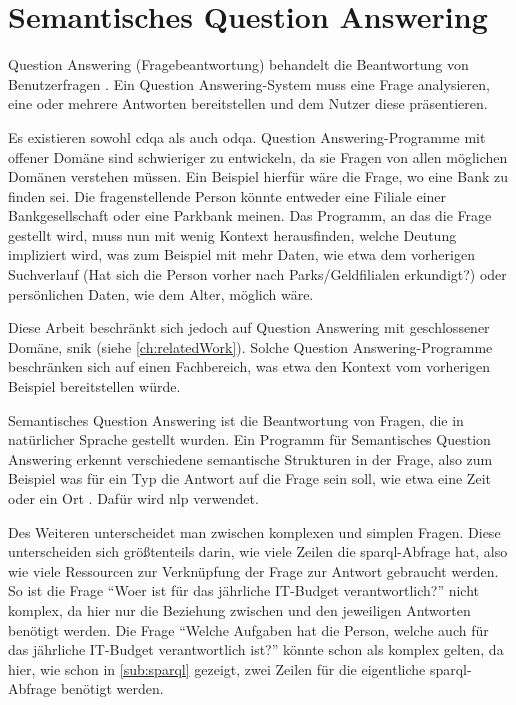 \section{Semantisches Question Answering}

\begin{definition}
Question Answering (Fragebeantwortung) behandelt die Beantwortung von Benutzerfragen \citep{qadefinition}.
Ein Question Answering-System muss eine Frage analysieren, eine oder mehrere Antworten bereitstellen und dem Nutzer diese präsentieren.
\end{definition}

Es existieren sowohl \ac{cdqa} als auch \ac{odqa}.
Question Answering-Programme mit offener Domäne sind schwieriger zu entwickeln,
da sie Fragen von allen möglichen Domänen verstehen müssen.
Ein Beispiel hierfür wäre die Frage, wo eine Bank zu finden sei.
Die fragenstellende Person könnte entweder eine Filiale einer Bankgesellschaft oder eine Parkbank meinen.
Das Programm, an das die Frage gestellt wird, muss nun mit wenig Kontext herausfinden,
welche Deutung impliziert wird, was zum Beispiel mit mehr Daten,
wie etwa dem vorherigen Suchverlauf (Hat sich die Person vorher nach Parks/Geldfilialen erkundigt?)
oder persönlichen Daten, wie dem Alter, möglich wäre.

Diese Arbeit beschränkt sich jedoch auf Question Answering mit geschlossener Domäne, \acs{snik} (siehe \cref{ch:relatedWork}).
Solche Question Answering-Programme beschränken sich auf einen Fachbereich,
was etwa den Kontext vom vorherigen Beispiel bereitstellen würde.

\begin{definition}
Semantisches Question Answering ist die Beantwortung von Fragen, die in natürlicher Sprache gestellt wurden.
Ein Programm für Semantisches Question Answering erkennt verschiedene semantische Strukturen in der Frage,
also zum Beispiel was für ein Typ die Antwort auf die Frage sein soll, wie etwa eine Zeit oder ein Ort \citep{sqadefinition}.
Dafür wird \acs{nlp} verwendet.
\end{definition}

Des Weiteren unterscheidet man zwischen komplexen und simplen Fragen.
Diese unterscheiden sich größtenteils darin, wie viele Zeilen die \ac{sparql}-Abfrage hat, also wie viele Ressourcen zur Verknüpfung der Frage zur Antwort gebraucht werden.
So ist die Frage \enquote{Woer ist für das jährliche IT-Budget verantwortlich?} nicht komplex,
da hier nur die Beziehung zwischen  und den jeweiligen Antworten benötigt werden.
Die Frage \enquote{Welche Aufgaben hat die Person, welche auch für das jährliche IT-Budget verantwortlich ist?} könnte schon als komplex gelten, da hier, wie schon in \cref{sub:sparql} gezeigt,
zwei Zeilen für die eigentliche \ac{sparql}-Abfrage benötigt werden.

